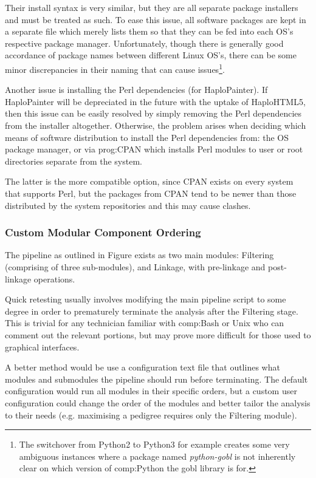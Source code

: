 Their install syntax is very similar, but they are all separate package installers and must be treated as such. To ease this issue, all software packages are kept in a separate file which merely lists them so that they can be fed into each OS's respective package manager. Unfortunately, though there is generally good accordance of package names between different Linux OS's, there can be some minor discrepancies in their naming that can cause issues\footnote{The switchover from Python2 to Python3 for example creates some very ambiguous instances where a package named \textit{python-gobl} is not inherently clear on which version of \gls{comp:Python} the gobl library is for.}.

Another issue is installing the Perl dependencies (for HaploPainter). If HaploPainter will be depreciated in the future with the uptake of HaploHTML5, then this issue can be easily resolved by simply removing the Perl dependencies from the installer altogether. Otherwise, the problem arises when deciding which means of software distribution to install the Perl dependencies from: the OS package manager, or via \gls{prog:CPAN} \cite{cpan} which installs Perl modules to user or root directories separate from the system.

The latter is the more compatible option, since CPAN exists on every system that supports Perl, but the packages from CPAN tend to be newer than those distributed by the system repositories and this may cause clashes.


\subsubsection{Custom Modular Component Ordering}

The pipeline as outlined in Figure exists as two main modules: Filtering (comprising of three sub-modules), and Linkage, with pre-linkage and post-linkage operations.

Quick retesting usually involves modifying the main pipeline script to some degree in order to prematurely terminate the analysis after the Filtering stage. This is trivial for any technician familiar with \gls{comp:Bash} or Unix who can comment out the relevant portions, but may prove more difficult for those used to graphical interfaces.

A better method would be use a configuration text file that outlines what modules and submodules the pipeline should run before terminating. The default configuration would run all modules in their specific orders, but a custom user configuration could change the order of the modules and better tailor the analysis to their needs (e.g. maximising a pedigree requires only the Filtering module).

